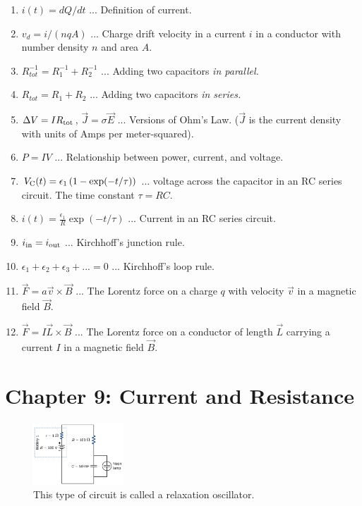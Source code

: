 \documentclass[10pt]{article}
\begin{document}
\begin{enumerate}
\item $i(t) = dQ/dt$ ... Definition of current.
\item $v_d = i/(nqA)$ ... Charge drift velocity in a current $i$ in a conductor with number density $n$ and area $A$.
\item $R_{tot}^{-1} = R_1^{-1} + R_2^{-1}$ ... Adding two capacitors \textit{in parallel.}
\item $R_{tot} = R_1 + R_2$ ... Adding two capacitors \textit{in series.}
\item $\Delta V = I R_{\rm tot}$, $\vec{J} = \sigma \vec{E}$ ... Versions of Ohm's Law. ($\vec{J}$ is the current density with units of Amps per meter-squared).
\item $P = I V$ ... Relationship between power, current, and voltage.
\item $V_{\rm C}(t) = \epsilon_1 \left(1 - \exp(-t/\tau)\right)$ ... voltage across the capacitor in an RC series circuit.  The time constant $\tau = RC$.
\item $i(t) = \frac{\epsilon_1}{R} \exp(-t/\tau)$ ... Current in an RC series circuit.
\item $i_{\rm in} = i_{\rm out}$ ... Kirchhoff's junction rule.
\item $\epsilon_1 + \epsilon_2 + \epsilon_3 + ... = 0$ ... Kirchhoff's loop rule.
\item $\vec{F} = a\vec{v} \times \vec{B}$ ... The Lorentz force on a charge $q$ with velocity $\vec{v}$ in a magnetic field $\vec{B}$.
\item $\vec{F} = I\vec{L} \times \vec{B}$ ... The Lorentz force on a conductor of length $\vec{L}$ carrying a current $I$ in a magnetic field $\vec{B}$.
\end{enumerate}

\clearpage

\section{Chapter 9: Current and Resistance}

\begin{figure}[ht]
\centering
\includegraphics[width=0.3\textwidth]{circuit3.png}
\caption{\label{fig:circuit3} This type of circuit is called a relaxation oscillator.}
\end{figure}
\end{document}
